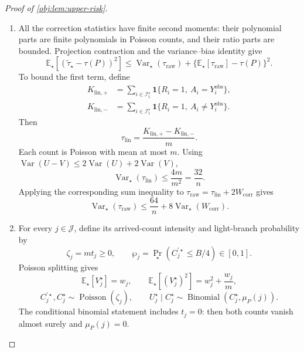 \begin{proof}[Proof of \cref{obj:lem:upper-risk}]
\begin{enumerate}
\item All the correction statistics have finite second moments: their polynomial parts are finite polynomials in Poisson counts, and their ratio parts are bounded. Projection contraction and the variance--bias identity give
\[
\mathbb E_\star[(\widetilde\tau_\star-\tau(P))^2]
\le
\operatorname{Var}_\star(\tau_{\mathrm{raw}})
+\{\mathbb E_\star[\tau_{\mathrm{raw}}]-\tau(P)\}^2.
\]
To bound the first term, define
\[
\begin{aligned}
K_{\mathrm{lin},+}
&=\sum_{i\in\mathcal I_1^\star}
\mathbf1\{R_i=1,\ A_i=Y_i^{\mathrm{obs}}\},\\
K_{\mathrm{lin},-}
&=\sum_{i\in\mathcal I_1^\star}
\mathbf1\{R_i=1,\ A_i\ne Y_i^{\mathrm{obs}}\}.
\end{aligned}
\]
Then
\[
\tau_{\mathrm{lin}}
=\frac{K_{\mathrm{lin},+}-K_{\mathrm{lin},-}}m.
\]
Each count is Poisson with mean at most \(m\). Using
\(\operatorname{Var}(U-V)\le2\operatorname{Var}(U)+2\operatorname{Var}(V)\),
\[
\operatorname{Var}_\star(\tau_{\mathrm{lin}})
\le\frac{4m}{m^2}
=\frac{32}{n}.
\]
Applying the corresponding sum inequality to
\(\tau_{\mathrm{raw}}=\tau_{\mathrm{lin}}+2W_{\mathrm{corr}}\) gives
\[
\operatorname{Var}_\star(\tau_{\mathrm{raw}})
\le\frac{64}{n}
+8\operatorname{Var}_\star(W_{\mathrm{corr}}).
\]

\item For every \(j\in\mathcal J\), define its arrived-count intensity and light-branch probability by
\[
\zeta_j=mt_j\ge0,
\qquad
\wp_j=\Pr_\star(C_j^{\prime\star}\le B/4)\in[0,1].
\]
Poisson splitting gives
\[
\mathbb E_\star[V_j^\star]=w_j,
\qquad
\mathbb E_\star[(V_j^\star)^2]=w_j^2+\frac{w_j}{m},
\]
\[
C_j^{\prime\star},C_j^\star\sim\operatorname{Poisson}(\zeta_j),
\qquad
U_j^\star\mid C_j^\star
\sim\operatorname{Binomial}(C_j^\star,\mu_P(j)).
\]
The conditional binomial statement includes \(t_j=0\): then both counts vanish almost surely and \(\mu_P(j)=0\).


\end{enumerate}
\end{proof}
